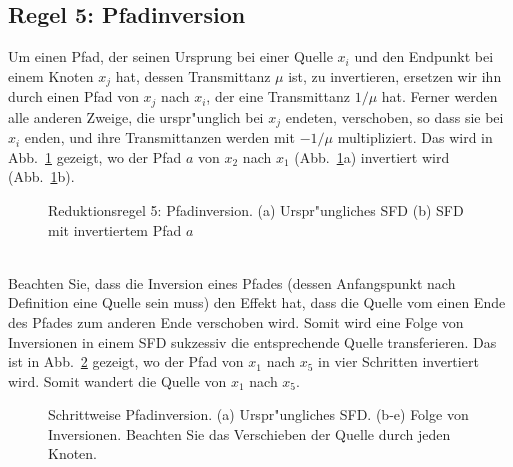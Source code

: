 \subsection{Regel 5: \label{abschnitt13} Pfadinversion } 
Um einen Pfad, der seinen Ursprung bei einer Quelle $x_i$ und den
Endpunkt bei einem Knoten $x_j$ hat, dessen Transmittanz $\mu$ ist, zu
invertieren, ersetzen wir ihn durch einen Pfad von $x_j$ nach $x_i$,
der eine Transmittanz $1/\mu$ hat.  Ferner werden alle anderen Zweige,
die urspr"unglich bei $x_j$ endeten, verschoben, so dass sie bei $x_i$
enden, und ihre Transmittanzen werden mit $-1/\mu$ multipliziert. Das
wird in Abb.~\ref{SFD12} gezeigt, wo der Pfad $a$ von $x_2$ nach $x_1$
(Abb.~\ref{SFD12}a) invertiert wird (Abb.~\ref{SFD12}b).\\
\begin{figure}[htb!]
\begin{center}
  \caption{Reduktionsregel 5: Pfadinversion. (a) Urspr"ungliches SFD (b) SFD mit invertiertem Pfad $a$}\label{SFD12}
\end{center}
\vspace*{-7mm}
\end{figure}\\
\nit Beachten Sie, dass die Inversion eines Pfades (dessen
Anfangspunkt nach Definition eine Quelle sein muss) den Effekt hat,
dass die Quelle vom einen Ende des Pfades zum anderen Ende verschoben
wird. Somit wird eine Folge von Inversionen in einem SFD sukzessiv die
entsprechende Quelle transferieren. Das ist in Abb.~\ref{SFD13}
gezeigt, wo der Pfad von $x_1$ nach $x_5$ in vier Schritten invertiert
wird. Somit wandert
die Quelle von $x_1$ nach $x_5$.\\
\begin{figure}[htb!]
\vspace*{-8mm}\begin{center}
  \caption{Schrittweise Pfadinversion. (a) Urspr"ungliches SFD. (b-e) Folge von Inversionen. Beachten Sie das Verschieben der Quelle durch jeden Knoten.}\label{SFD13}
\end{center}
\vspace*{-7mm}
\end{figure}


